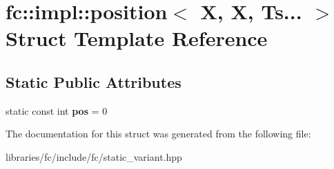 \hypertarget{structfc_1_1impl_1_1position_3_01_x_00_01_x_00_01_ts_8_8_8_01_4}{}\section{fc\+:\+:impl\+:\+:position$<$ X, X, Ts... $>$ Struct Template Reference}
\label{structfc_1_1impl_1_1position_3_01_x_00_01_x_00_01_ts_8_8_8_01_4}
\subsection*{Static Public Attributes}
\begin{DoxyCompactItemize}
\item 
\mbox{\label{structfc_1_1impl_1_1position_3_01_x_00_01_x_00_01_ts_8_8_8_01_4_ae380c54eaa00f987631ebe644f61bd8e}} 
static const int {\bfseries pos} = 0
\end{DoxyCompactItemize}


The documentation for this struct was generated from the following file\+:\begin{DoxyCompactItemize}
\item 
libraries/fc/include/fc/static\+\_\+variant.\+hpp\end{DoxyCompactItemize}
